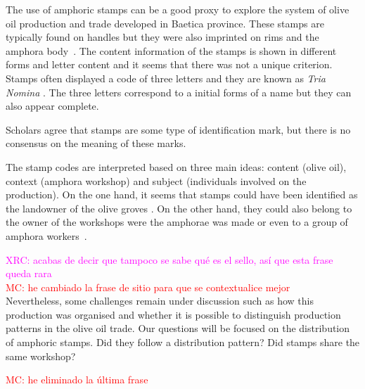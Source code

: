 \documentclass[review]{elsarticle}
\newcommand{\memo}[2]{\textcolor{#1}{#2}}
\newcommand{\maria}[1]{\memo{red}{MC: #1\\}}
\newcommand{\xavi}[1]{\memo{magenta}{XRC: #1\\}}
\begin{document}
The use of amphoric stamps can be a good proxy to explore the system of olive oil production and trade developed in Baetica province. These stamps are typically found on handles but they were also imprinted on rims and the amphora body~\citep{millet_anforas_1998}. The content information of the stamps is shown in different forms and letter content and it seems that there was not a unique criterion.
Stamps often displayed a code of three letters and they are known as \textit{Tria Nomina} \citep{berni_millet_amphora_1996}. The three letters correspond to a initial forms of a name but they can also appear complete. 

Scholars agree that stamps are some type of identification mark, but there is no consensus on the meaning of these marks\citep{rodriguez_baetican_1998}. 


The stamp codes are interpreted based on three main ideas: content (olive oil), context (amphora workshop) and subject (individuals involved on the production). On the one hand, it seems that stamps could have been identified as the landowner of the olive groves \citep{rodriguez_economioleicola_1977}. On the other hand, they could also belong to the owner of the workshops were the amphorae was made or even to a group of amphora workers~\citep{berni_millet_epigrafianforica_2008}. 

\xavi{acabas de decir que tampoco se sabe qué es el sello, así que esta frase queda rara} 
\maria{he cambiado la frase de sitio para que se contextualice mejor}
Nevertheless, some challenges remain under discussion such as how this production was organised and whether it is possible to distinguish production patterns in the olive oil trade. Our questions will be focused on the distribution of amphoric stamps. Did they follow a distribution pattern? Did stamps share the same workshop? 

\maria{he eliminado la última frase}
  
\end{document}
